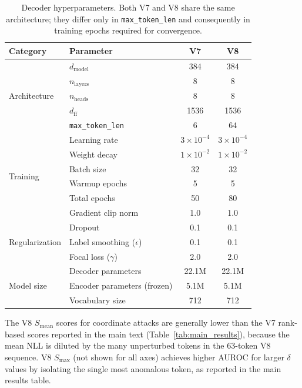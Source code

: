 \begin{table}[ht]
\centering
\caption{Decoder hyperparameters. Both V7 and V8 share the same architecture; they differ only in \texttt{max\_token\_len} and consequently in training epochs required for convergence.}
\label{tab:hyperparameters}
\small
\begin{tabular}{@{}llcc@{}}
\toprule
Category & Parameter & V7 & V8 \\
\midrule
\multirow{5}{*}{Architecture} & $d_{\text{model}}$ & 384 & 384 \\
& $n_{\text{layers}}$ & 8 & 8 \\
& $n_{\text{heads}}$ & 8 & 8 \\
& $d_{\text{ff}}$ & 1536 & 1536 \\
& \texttt{max\_token\_len} & 6 & 64 \\
\midrule
\multirow{6}{*}{Training} & Learning rate & $3 \times 10^{-4}$ & $3 \times 10^{-4}$ \\
& Weight decay & $1 \times 10^{-2}$ & $1 \times 10^{-2}$ \\
& Batch size & 32 & 32 \\
& Warmup epochs & 5 & 5 \\
& Total epochs & 50 & 80 \\
& Gradient clip norm & 1.0 & 1.0 \\
\midrule
\multirow{3}{*}{Regularization} & Dropout & 0.1 & 0.1 \\
& Label smoothing ($\epsilon$) & 0.1 & 0.1 \\
& Focal loss ($\gamma$) & 2.0 & 2.0 \\
\midrule
\multirow{3}{*}{Model size} & Decoder parameters & 22.1M & 22.1M \\
& Encoder parameters (frozen) & 5.1M & 5.1M \\
& Vocabulary size & 712 & 712 \\
\bottomrule
\end{tabular}
\end{table}


The V8 $S_{\text{mean}}$ scores for coordinate attacks are generally lower than the V7 rank-based scores reported in the main text (Table~\ref{tab:main_results}), because the mean NLL is diluted by the many unperturbed tokens in the 63-token V8 sequence.
V8 $S_{\max}$ (not shown for all axes) achieves higher AUROC for larger $\delta$ values by isolating the single most anomalous token, as reported in the main results table.
